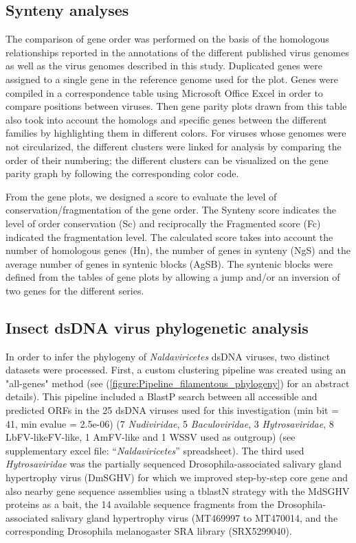 \subsection{Synteny analyses}

The comparison of gene order was performed on the basis of the homologous relationships reported in the annotations of the different published virus genomes as well as the virus genomes described in this study.  Duplicated genes were assigned to a single gene in the reference genome used for the plot. Genes were compiled in a correspondence table using Microsoft Office Excel in order to compare positions between viruses. Then gene parity plots drawn from this table also took into account the homologs and specific genes between the different families by highlighting them in different colors. For viruses whose genomes were not circularized, the different clusters were linked for analysis by comparing the order of their numbering; the different clusters can be visualized on the gene parity graph by following the corresponding color code. 

From the gene plots, we designed a score to evaluate the level of conservation/fragmentation of the gene order. The Synteny score indicates the level of order conservation (Sc) and reciprocally the Fragmented score (Fc) indicated the fragmentation level. The calculated score takes into account the number of homologous genes (Hn), the number of genes in synteny (NgS) and the average number of genes in syntenic blocks (AgSB). The syntenic blocks were defined from the tables of gene plots by allowing a jump and/or an inversion of two genes for the different series.     

\subsection{Insect dsDNA virus phylogenetic analysis}

In order to infer the phylogeny of \textit{Naldaviricetes} dsDNA viruses, two distinct datasets were processed. First, a custom clustering pipeline was created using an "all-genes" method (see (\figurename{\ref{figure:Pipeline_filamentous_phylogeny}}) for an abstract details). This pipeline included a BlastP search between all accessible and predicted ORFs in the 25 dsDNA viruses used for this investigation (min bit = 41, min evalue = 2.5e-06) (7 \textit{Nudiviridae}, 5 \textit{Baculoviridae}, 3 \textit{Hytrosaviridae}, 8 LbFV-likeFV-like, 1 AmFV-like and 1 WSSV used as outgroup) (see supplementary excel file: “\textit{Naldaviricetes}” spreadsheet). The third used \textit{Hytrosaviridae} was the partially sequenced Drosophila-associated salivary gland hypertrophy virus (DmSGHV) for which we improved step-by-step core gene and also nearby gene sequence assemblies using a tblastN strategy with the MdSGHV proteins as a bait, the 14 available sequence fragments from the Drosophila-associated salivary gland hypertrophy virus (MT469997 to MT470014, \citep{wallace_discovery_2021} and the corresponding Drosophila melanogaster SRA library (SRX5299040). 

